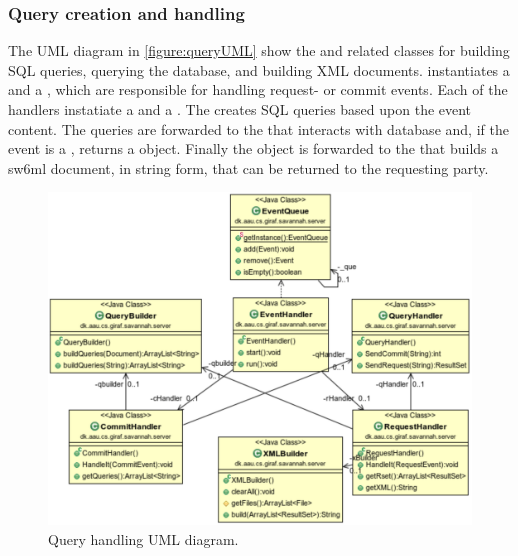 \subsubsection{Query creation and handling}

The UML diagram in \autoref{figure:queryUML} show the  and related classes for building SQL queries, querying the database, and building XML documents.
 instantiates a  and a , which are responsible for handling request- or commit events.
Each of the handlers instatiate a  and a . The  creates SQL queries based upon the event content. The queries are forwarded to the 
that interacts with database and, if the event is a , returns a  object. Finally the  object is forwarded to the  that builds a sw6ml document,
in string form, that can be returned to the requesting party. 
\begin{figure}[H]
 \centering
  \includegraphics[scale=0.65]{images/queryhandling}
  \caption{Query handling UML diagram.}
  \label{figure:queryUML}
\end{figure}

